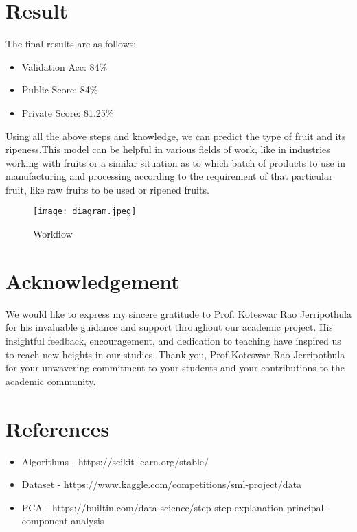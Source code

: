 \documentclass[conference]{IEEEtran}
\begin{document}
\section{Result}
The final results are as follows: 
\begin{itemize}
\item Validation Acc: 84\%
\item Public Score: 84\%    
\item Private Score: 81.25\% 
\end{itemize}
Using all the above steps and knowledge, we can predict the type of fruit and its ripeness.This model can be helpful in various fields of work, like in industries working with fruits or a similar situation as to which batch of products to use in manufacturing and processing according to the requirement of that particular fruit, like raw fruits to be used or ripened fruits.


\begin{figure}
\centerline{\texttt{[image: diagram.jpeg]}}
\caption{Workflow}
\label{fig}
\end{figure}




\section{Acknowledgement}

We would like to express my sincere gratitude to Prof. Koteswar Rao Jerripothula for his invaluable guidance and support throughout our academic project. His insightful feedback, encouragement, and dedication to teaching have inspired us to reach new heights in our studies. Thank you, Prof Koteswar Rao Jerripothula for your unwavering commitment to your students and your contributions to the academic community.



\section{References}
\begin{itemize}
    \item Algorithms - https://scikit-learn.org/stable/
    \item Dataset - https://www.kaggle.com/competitions/sml-project/data
    \item PCA - https://builtin.com/data-science/step-step-explanation-principal-component-analysis
    
\end{itemize}
\end{document}
